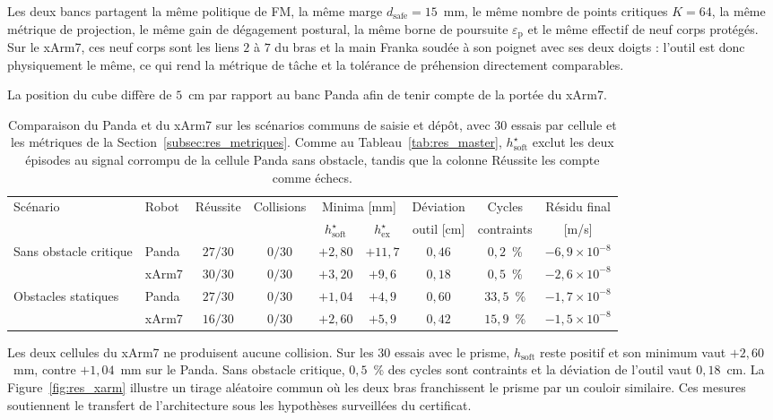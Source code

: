 Les deux bancs partagent la même politique de \ac{FM}, la même marge $d_{\mathrm{safe}} = 15$~mm, le même nombre de points critiques $K=64$, la même métrique de projection, le même gain de dégagement postural, la même borne de poursuite $\varepsilon_{\mathrm{p}}$ et le même effectif de neuf corps protégés. Sur le xArm7, ces neuf corps sont les liens $2$ à $7$ du bras et la main Franka soudée à son poignet avec ses deux doigts : l'outil est donc physiquement le même, ce qui rend la métrique de tâche et la tolérance de préhension directement comparables.

La position du cube diffère de $5$~cm par rapport au banc Panda afin de tenir compte de la portée du xArm7.

\begin{table}[htbp]
\centering
\caption[Comparaison des performances entre le Panda et le xArm7]{Comparaison du Panda et du xArm7 sur les scénarios communs de saisie et dépôt, avec $30$ essais par cellule et les métriques de la Section~\ref{subsec:res_metriques}. Comme au Tableau~\ref{tab:res_master}, $h_{\mathrm{soft}}^{\star}$ exclut les deux épisodes au signal corrompu de la cellule Panda sans obstacle, tandis que la colonne Réussite les compte comme échecs.}
\label{tab:res_xarm}
\scriptsize
\setlength{\tabcolsep}{2.5pt}
\begin{tabular}{llccccccc}
\toprule
Scénario & Robot & Réussite & Collisions & \multicolumn{2}{c}{Minima [mm]} & Déviation & Cycles & Résidu final \\
\cmidrule(lr){5-6}
 & & & & $h_{\mathrm{soft}}^{\star}$ & $h_{\mathrm{ex}}^{\star}$ & outil [cm] & contraints & [m/s] \\
\midrule
Sans obstacle critique  & Panda & $27/30$ & $0/30$ & $+2{,}80$ & $+11{,}7$ & $0{,}46$ & $0{,}2$~\%  & $-6{,}9\times10^{-8}$ \\
                        & xArm7 & $30/30$ & $0/30$ & $+3{,}20$ & $+9{,}6$  & $0{,}18$ & $0{,}5$~\%  & $-2{,}6\times10^{-8}$ \\
\addlinespace
Obstacles statiques & Panda & $27/30$ & $0/30$ & $+1{,}04$ & $+4{,}9$  & $0{,}60$ & $33{,}5$~\% & $-1{,}7\times10^{-8}$ \\
                    & xArm7 & $16/30$ & $0/30$ & $+2{,}60$ & $+5{,}9$  & $0{,}42$ & $15{,}9$~\% & $-1{,}5\times10^{-8}$ \\
\bottomrule
\end{tabular}
\end{table}

Les deux cellules du xArm7 ne produisent aucune collision. Sur les $30$ essais avec le prisme, $h_{\mathrm{soft}}$ reste positif et son minimum vaut $+2{,}60$~mm, contre $+1{,}04$~mm sur le Panda. Sans obstacle critique, $0{,}5$~\% des cycles sont contraints et la déviation de l'outil vaut $0{,}18$~cm. La Figure~\ref{fig:res_xarm} illustre un tirage aléatoire commun où les deux bras franchissent le prisme par un couloir similaire. Ces mesures soutiennent le transfert de l'architecture sous les hypothèses surveillées du certificat.

